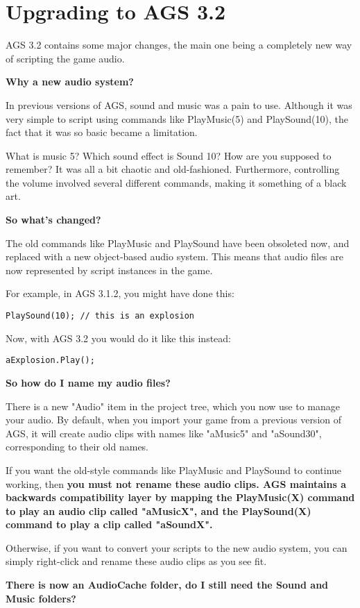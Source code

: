 \chapter{Upgrading to AGS 3.2}\label{UpgradeTo32}%

AGS 3.2 contains some major changes, the main one being a completely new way of
scripting the game audio.

\bf{Why a new audio system?}

In previous versions of AGS, sound and music was a pain to use. Although it was
very simple to script using commands like PlayMusic(5) and PlaySound(10), the
fact that it was so basic became a limitation.

What is music 5? Which sound effect is Sound 10? How are you supposed to remember?
It was all a bit chaotic and old-fashioned. Furthermore, controlling the volume
involved several different commands, making it something of a black art.

\bf{So what's changed?}

The old commands like PlayMusic and PlaySound have been obsoleted now, and replaced
with a new object-based audio system. This means that audio files are now represented
by script instances in the game.

For example, in AGS 3.1.2, you might have done this:

\verb$PlaySound(10); // this is an explosion$

Now, with AGS 3.2 you would do it like this instead:

\verb$aExplosion.Play();$

\bf{So how do I name my audio files?}

There is a new "Audio" item in the project tree, which you now use to manage your audio.
By default, when you import your game from a previous version of AGS, it will create
audio clips with names like "aMusic5" and "aSound30", corresponding to their old names.

If you want the old-style commands like PlayMusic and PlaySound to continue working,
then \bf{you must not rename these audio clips}. AGS maintains a backwards compatibility
layer by mapping the PlayMusic(X) command to play an audio clip called "aMusicX", and
the PlaySound(X) command to play a clip called "aSoundX".

Otherwise, if you want to convert your scripts to the new audio system, you can simply
right-click and rename these audio clips as you see fit.

\bf{There is now an AudioCache folder, do I still need the Sound and Music folders?}

